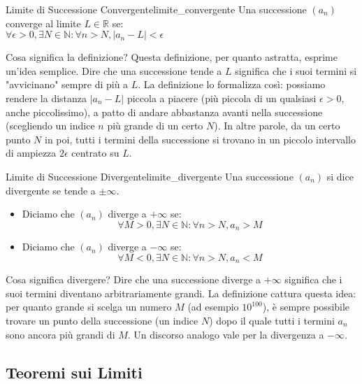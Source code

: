 \documentclass{article}
\begin{document}
\begin{definition}{Limite di Successione Convergente}{limite_convergente}
    Una successione $(a_n)$ converge al limite $L \in \mathbb{R}$ se:
    \\[1em]
    $\forall \epsilon > 0, \exists N \in \mathbb{N} : \forall n > N, |a_n - L| < \epsilon$
\end{definition}

\begin{explanation}{Cosa significa la definizione?}{}
    Questa definizione, per quanto astratta, esprime un'idea semplice. Dire che una successione tende a $L$ significa che i suoi termini si "avvicinano" sempre di più a $L$.
    La definizione lo formalizza così: possiamo rendere la distanza $|a_n - L|$ piccola a piacere (più piccola di un qualsiasi $\epsilon > 0$, anche piccolissimo), a patto di andare abbastanza avanti nella successione (scegliendo un indice $n$ più grande di un certo $N$). In altre parole, da un certo punto $N$ in poi, tutti i termini della successione si trovano in un piccolo intervallo di ampiezza $2\epsilon$ centrato su $L$.
\end{explanation}

\begin{definition}{Limite di Successione Divergente}{limite_divergente}
    Una successione $(a_n)$ si dice divergente se tende a $\pm\infty$.
    \begin{itemize}
        \item Diciamo che $(a_n)$ diverge a $+\infty$ se:
         $$ \forall M > 0, \exists N \in \mathbb{N} : \forall n > N, a_n > M $$
        \item Diciamo che $(a_n)$ diverge a $-\infty$ se:
         $$ \forall M < 0, \exists N \in \mathbb{N} : \forall n > N, a_n < M $$
    \end{itemize}
\end{definition}

\begin{explanation}{Cosa significa divergere?}{}
    Dire che una successione diverge a $+\infty$ significa che i suoi termini diventano arbitrariamente grandi. La definizione cattura questa idea: per quanto grande si scelga un numero $M$ (ad esempio $10^{100}$), è sempre possibile trovare un punto della successione (un indice $N$) dopo il quale tutti i termini $a_n$ sono ancora più grandi di $M$. Un discorso analogo vale per la divergenza a $-\infty$.
\end{explanation}

\subsection{Teoremi sui Limiti}
\end{document}

